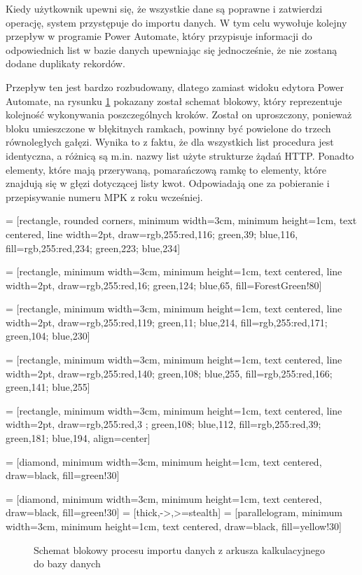 Kiedy użytkownik upewni się, że wszystkie dane są poprawne i zatwierdzi operację, system przystępuje do importu danych. W tym celu wywołuje kolejny przepływ w programie Power Automate, który przypisuje informacji do odpowiednich list w bazie danych upewniając się jednocześnie, że nie zostaną dodane duplikaty rekordów.

\noindent Przepływ ten jest bardzo rozbudowany, dlatego zamiast widoku edytora Power Automate, na rysunku \ref{fig:flowchart} pokazany został schemat blokowy, który reprezentuje kolejność wykonywania poszczególnych kroków. Został on uproszczony, ponieważ bloku umieszczone w błękitnych ramkach, powinny być powielone do trzech równoległych gałęzi. Wynika to z faktu, że dla wszystkich list procedura jest identyczna, a różnicą są m.in. nazwy list użyte strukturze żądań HTTP. Ponadto elementy, które mają przerywaną, pomarańczową ramkę to elementy, które znajdują się w głęzi dotyczącej listy kwot. Odpowiadają one za pobieranie i przepisywanie numeru MPK z roku wcześniej.


{} = [rectangle, rounded corners, minimum width=3cm, minimum height=1cm, text centered, line width=2pt, draw={rgb,255:red,116; green,39; blue,116}, fill={rgb,255:red,234; green,223; blue,234}]

 = [rectangle, minimum width=3cm, minimum height=1cm, text centered, line width=2pt, draw={rgb,255:red,16; green,124; blue,65}, fill=ForestGreen!80]

 = [rectangle, minimum width=3cm, minimum height=1cm, text centered, line width=2pt, draw={rgb,255:red,119; green,11; blue,214}, fill={rgb,255:red,171; green,104; blue,230}]

 = [rectangle, minimum width=3cm, minimum height=1cm, text centered, line width=2pt, draw={rgb,255:red,140; green,108; blue,255}, fill={rgb,255:red,166; green,141; blue,255}]

 = [rectangle, minimum width=3cm, minimum height=1cm, text centered, line width=2pt, draw={rgb,255:red,3 ; green,108; blue,112}, fill={rgb,255:red,39; green,181; blue,194}, align=center]

 = [diamond, minimum width=3cm, minimum height=1cm, text centered, draw=black, fill=green!30]

 = [diamond, minimum width=3cm, minimum height=1cm, text centered, draw=black, fill=green!30]
 = [thick,->,>=stealth]
 = [parallelogram, minimum width=3cm, minimum height=1cm, text centered, draw=black, fill=yellow!30]
\begin{figure}
    \resizebox{0.95\textwidth}{!}{%
        
    }
    \caption{Schemat blokowy procesu importu danych z arkusza kalkulacyjnego do bazy danych}
    \label{fig:flowchart}
\end{figure}

